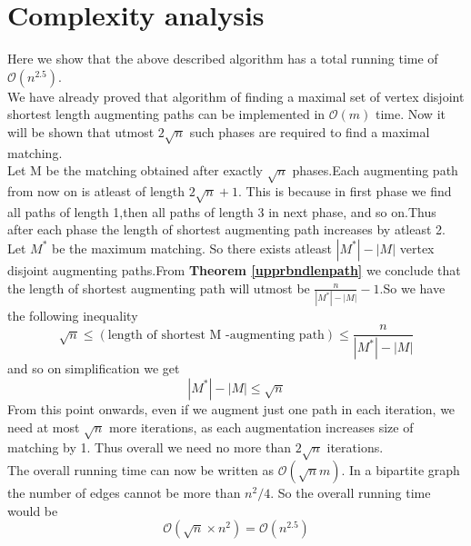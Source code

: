 \documentclass[a4paper]{report}
\theoremstyle{definition}
\begin{document}
\section{Complexity analysis}
Here we show that the above described algorithm has a total running time of $\mathcal{O}(n^{2.5})$.\\
We have already proved that algorithm of finding a maximal set of vertex disjoint shortest length augmenting paths can be implemented in $\mathcal{O}(m)$ time.
Now it will be shown that utmost $2\sqrt{n}$ such phases are required to find a maximal matching.\\
Let M be the matching obtained after exactly $\sqrt{n}$ phases.Each augmenting path from now on is atleast of length $2\sqrt{n}+1$. This is because in first phase we find all paths of length 1,then all paths of length 3 in next phase, and so on.Thus after each phase the length of shortest augmenting path increases by atleast 2. Let $M^*$ be the maximum matching. So there exists atleast $|M^*|-|M|$ vertex disjoint augmenting paths.From \textbf{Theorem \ref{upprbndlenpath}} we conclude that the length of shortest augmenting path will utmost be $\frac{n}{|M^*|-|M|} -1$.So we have the following inequality $$\sqrt{n} \leq (\mbox{length of shortest M -augmenting path})\leq\frac{n}{|M^*|-|M|}$$
and so on simplification we get $$|M^*| - |M | \leq \sqrt{n}$$
From this point onwards, even if we augment just one path in each iteration, we need at most $\sqrt{n}$ more iterations, as each augmentation increases size of matching by 1. Thus overall we need no more than $2\sqrt{n}$ iterations.\\
The overall running time can now be written as $\mathcal{O}(\sqrt{n}m)$. In a bipartite graph the number of edges cannot be more than $n^2/4$. So the overall running time would be $$\mathcal{O}(\sqrt{n}\times n^2) = \mathcal{O}(n^{2.5})$$
\end{document}
